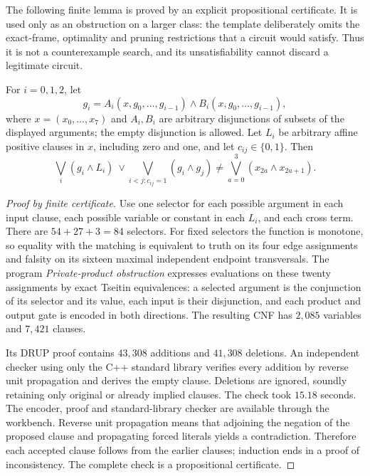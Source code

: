 The following finite lemma is proved by an explicit propositional certificate. It is used only as an obstruction on a larger class: the template deliberately omits the exact-frame, optimality and pruning restrictions that a circuit would satisfy. Thus it is not a counterexample search, and its unsatisfiability cannot discard a legitimate circuit.

\begin{lemma}\label{lem:threeprivatefinite}
For $i=0,1,2$, let
\[
 g_i=A_i(x,g_0,\ldots,g_{i-1})\wedge B_i(x,g_0,\ldots,g_{i-1}),
\]
where $x=(x_0,\ldots,x_7)$ and $A_i,B_i$ are arbitrary disjunctions of subsets of the displayed arguments; the empty disjunction is allowed.
Let $L_i$ be arbitrary affine positive clauses in $x$, including zero and one, and let $c_{ij}\in\{0,1\}$.
Then
\[
 \bigvee_i(g_i\wedge L_i)\ \vee\!
 \bigvee_{i<j:c_{ij}=1}(g_i\wedge g_j)
 \ne\bigvee_{a=0}^3(x_{2a}\wedge x_{2a+1}).
\]
\end{lemma}
\begin{proof}[Proof by finite certificate]
Use one selector for each possible argument in each input clause, each possible variable or constant in each $L_i$, and each cross term. There are $54+27+3=84$ selectors. For fixed selectors the function is monotone, so equality with the matching is equivalent to truth on its four edge assignments and falsity on its sixteen maximal independent endpoint transversals.
The program \emph{Private-product obstruction} expresses evaluations on these twenty assignments by exact Tseitin equivalences: a selected argument is the conjunction of its selector and its value, each input is their disjunction, and each product and output gate is encoded in both directions.
The resulting CNF has $2{,}085$ variables and $7{,}421$ clauses.

Its DRUP proof contains $43{,}308$ additions and $41{,}308$ deletions. An independent checker using only the C++ standard library verifies every addition by reverse unit propagation and derives the empty clause. Deletions are ignored, soundly retaining only original or already implied clauses. The check took $15.18$ seconds. The encoder, proof and standard-library checker are available through the workbench. Reverse unit propagation means that adjoining the negation of the proposed clause and propagating forced literals yields a contradiction. Therefore each accepted clause follows from the earlier clauses; induction ends in a proof of inconsistency. The complete check is a propositional certificate.
\end{proof}


